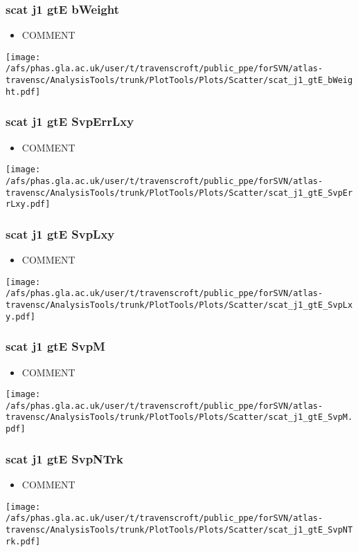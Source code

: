 \documentclass{beamer}
\begin{document}
\begin{frame}
\frametitle{scat j1 gtE bWeight}
\begin{itemize}
\item COMMENT
\end{itemize}
\begin{center}
\texttt{[image: /afs/phas.gla.ac.uk/user/t/travenscroft/public\_ppe/forSVN/atlas-travensc/AnalysisTools/trunk/PlotTools/Plots/Scatter/scat\_j1\_gtE\_bWeight.pdf]}
\end{center}
\end{frame}

\begin{frame}
\frametitle{scat j1 gtE SvpErrLxy}
\begin{itemize}
\item COMMENT
\end{itemize}
\begin{center}
\texttt{[image: /afs/phas.gla.ac.uk/user/t/travenscroft/public\_ppe/forSVN/atlas-travensc/AnalysisTools/trunk/PlotTools/Plots/Scatter/scat\_j1\_gtE\_SvpErrLxy.pdf]}
\end{center}
\end{frame}

\begin{frame}
\frametitle{scat j1 gtE SvpLxy}
\begin{itemize}
\item COMMENT
\end{itemize}
\begin{center}
\texttt{[image: /afs/phas.gla.ac.uk/user/t/travenscroft/public\_ppe/forSVN/atlas-travensc/AnalysisTools/trunk/PlotTools/Plots/Scatter/scat\_j1\_gtE\_SvpLxy.pdf]}
\end{center}
\end{frame}

\begin{frame}
\frametitle{scat j1 gtE SvpM}
\begin{itemize}
\item COMMENT
\end{itemize}
\begin{center}
\texttt{[image: /afs/phas.gla.ac.uk/user/t/travenscroft/public\_ppe/forSVN/atlas-travensc/AnalysisTools/trunk/PlotTools/Plots/Scatter/scat\_j1\_gtE\_SvpM.pdf]}
\end{center}
\end{frame}

\begin{frame}
\frametitle{scat j1 gtE SvpNTrk}
\begin{itemize}
\item COMMENT
\end{itemize}
\begin{center}
\texttt{[image: /afs/phas.gla.ac.uk/user/t/travenscroft/public\_ppe/forSVN/atlas-travensc/AnalysisTools/trunk/PlotTools/Plots/Scatter/scat\_j1\_gtE\_SvpNTrk.pdf]}
\end{center}
\end{frame}
\end{document}
